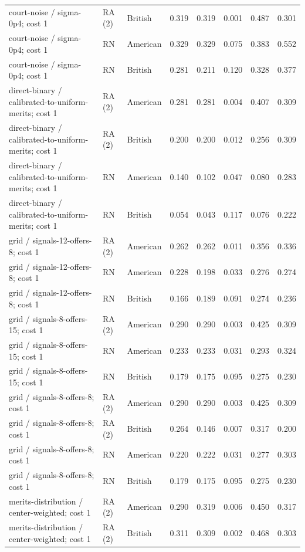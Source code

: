 \documentclass[10pt]{article}
\begin{document}
\begin{longtable}{@{}p{3.0in}llrrrrr@{}}
court-noise / sigma-0p4; cost 1 & RA (2) & British & 0.319 & 0.319 & 0.001 & 0.487 & 0.301\\
court-noise / sigma-0p4; cost 1 & RN & American & 0.329 & 0.329 & 0.075 & 0.383 & 0.552\\
court-noise / sigma-0p4; cost 1 & RN & British & 0.281 & 0.211 & 0.120 & 0.328 & 0.377\\
direct-binary / calibrated-to-uniform-merits; cost 1 & RA (2) & American & 0.281 & 0.281 & 0.004 & 0.407 & 0.309\\
direct-binary / calibrated-to-uniform-merits; cost 1 & RA (2) & British & 0.200 & 0.200 & 0.012 & 0.256 & 0.309\\
direct-binary / calibrated-to-uniform-merits; cost 1 & RN & American & 0.140 & 0.102 & 0.047 & 0.080 & 0.283\\
direct-binary / calibrated-to-uniform-merits; cost 1 & RN & British & 0.054 & 0.043 & 0.117 & 0.076 & 0.222\\
grid / signals-12-offers-8; cost 1 & RA (2) & American & 0.262 & 0.262 & 0.011 & 0.356 & 0.336\\
grid / signals-12-offers-8; cost 1 & RN & American & 0.228 & 0.198 & 0.033 & 0.276 & 0.274\\
grid / signals-12-offers-8; cost 1 & RN & British & 0.166 & 0.189 & 0.091 & 0.274 & 0.236\\
grid / signals-8-offers-15; cost 1 & RA (2) & American & 0.290 & 0.290 & 0.003 & 0.425 & 0.309\\
grid / signals-8-offers-15; cost 1 & RN & American & 0.233 & 0.233 & 0.031 & 0.293 & 0.324\\
grid / signals-8-offers-15; cost 1 & RN & British & 0.179 & 0.175 & 0.095 & 0.275 & 0.230\\
grid / signals-8-offers-8; cost 1 & RA (2) & American & 0.290 & 0.290 & 0.003 & 0.425 & 0.309\\
grid / signals-8-offers-8; cost 1 & RA (2) & British & 0.264 & 0.146 & 0.007 & 0.317 & 0.200\\
grid / signals-8-offers-8; cost 1 & RN & American & 0.220 & 0.222 & 0.031 & 0.277 & 0.303\\
grid / signals-8-offers-8; cost 1 & RN & British & 0.179 & 0.175 & 0.095 & 0.275 & 0.230\\
merits-distribution / center-weighted; cost 1 & RA (2) & American & 0.290 & 0.319 & 0.006 & 0.450 & 0.317\\
merits-distribution / center-weighted; cost 1 & RA (2) & British & 0.311 & 0.309 & 0.002 & 0.468 & 0.303\\

\end{longtable}
\end{document}
